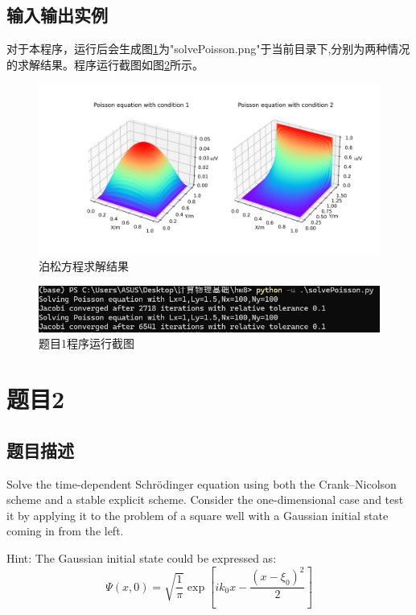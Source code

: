 \documentclass[11pt]{article}
\begin{document}
  
  
  
  \subsection{输入输出实例}

  对于本程序，运行后会生成图\ref{fig:1}为"solvePoisson.png"于当前目录下,分别为两种情况的求解结果。程序运行截图如图\ref{fig:p1}所示。

  \begin{figure}[ht]
    \centering
    \includegraphics[width=1\linewidth]{photo/solvePoisson.png}
    \caption{泊松方程求解结果}
    \label{fig:1}
  \end{figure}

  \begin{figure}
    \centering
    \includegraphics[width=0.6\linewidth]{photo/figp1.png}
    \caption{题目1程序运行截图}
    \label{fig:p1}
  \end{figure}

\section{题目2}
\subsection{题目描述}
Solve the time-dependent Schrödinger equation using both the Crank–Nicolson scheme and a stable explicit scheme. Consider the one-dimensional case and test it by applying it to the problem of a square well with a Gaussian initial state coming in from the left.

Hint: The Gaussian initial state could be expressed as:
\[
\Psi(x, 0) = \sqrt{\frac{1}{\pi}} \exp \left[ i k_0 x - \frac{(x - \xi_0)^2}{2} \right]
\]
\end{document}
